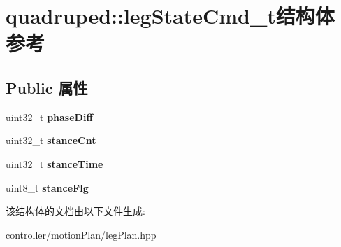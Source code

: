 \hypertarget{structquadruped_1_1legStateCmd__t}{}\section{quadruped\+:\+:leg\+State\+Cmd\+\_\+t结构体 参考}
\label{structquadruped_1_1legStateCmd__t}
\subsection*{Public 属性}
\begin{DoxyCompactItemize}
\item 
\mbox{\label{structquadruped_1_1legStateCmd__t_a4311a05a106a69432fabd660afed9325}} 
uint32\+\_\+t {\bfseries phase\+Diff}
\item 
\mbox{\label{structquadruped_1_1legStateCmd__t_ab8663802626fdea7f2f5494d0a8cbe87}} 
uint32\+\_\+t {\bfseries stance\+Cnt}
\item 
\mbox{\label{structquadruped_1_1legStateCmd__t_a1a520e9206e0561ceb79f9c1bce6d4ba}} 
uint32\+\_\+t {\bfseries stance\+Time}
\item 
\mbox{\label{structquadruped_1_1legStateCmd__t_ac81d9dd071bc1355b57e105c3041995f}} 
uint8\+\_\+t {\bfseries stance\+Flg}
\end{DoxyCompactItemize}


该结构体的文档由以下文件生成\+:\begin{DoxyCompactItemize}
\item 
controller/motion\+Plan/leg\+Plan.\+hpp\end{DoxyCompactItemize}
